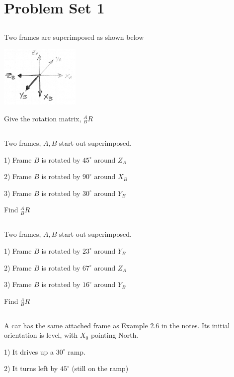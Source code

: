 \documentclass{article}
\begin{document}
\section{Problem Set 1}

\subsection{}
Two frames are superimposed as shown below

\includegraphics[width=1.5in]{00831.png}

Give the rotation matrix, $^A_BR$


\subsection{}
Two frames, $A, B$ start out superimposed.

1) Frame $B$ is rotated by $45^\circ$ around $Z_A$


2) Frame $B$ is rotated by $90^\circ$ around $X_B$


3) Frame $B$ is rotated by $30^\circ$ around $Y_B$

Find $^A_BR$

\subsection{}
Two frames, $A, B$ start out superimposed.

1) Frame $B$ is rotated by $23^\circ$ around $Y_B$


2) Frame $B$ is rotated by $67^\circ$ around $Z_A$


3) Frame $B$ is rotated by $16^\circ$ around $Y_B$

Find $^A_BR$


\subsection{}
A car has the same attached frame as Example 2.6 in the notes.  Its initial orientation is level, with $X_0$ pointing North.

1) It drives up a $30^\circ$ ramp.

2) It turns left by $45^\circ$ (still on the ramp)
\end{document}
